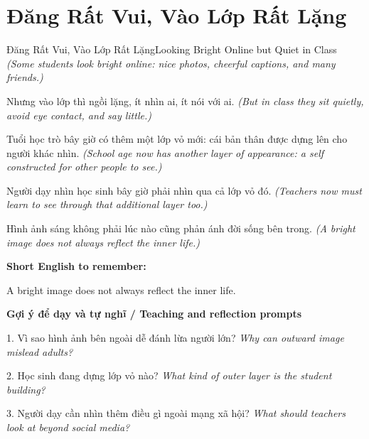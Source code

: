 \section{Đăng Rất Vui, Vào Lớp Rất Lặng}
\begin{truyen}{Đăng Rất Vui, Vào Lớp Rất Lặng}{Looking Bright Online but Quiet in Class}
\textit{(Some students look bright online: nice photos, cheerful captions, and many friends.)}

Nhưng vào lớp thì ngồi lặng, ít nhìn ai, ít nói với ai.
\textit{(But in class they sit quietly, avoid eye contact, and say little.)}

Tuổi học trò bây giờ có thêm một lớp vỏ mới: cái bản thân được dựng lên cho người khác nhìn.
\textit{(School age now has another layer of appearance: a self constructed for other people to see.)}

Người dạy nhìn học sinh bây giờ phải nhìn qua cả lớp vỏ đó.
\textit{(Teachers now must learn to see through that additional layer too.)}

\end{truyen}

\begin{baihoc}
Hình ảnh sáng không phải lúc nào cũng phản ánh đời sống bên trong.
\textit{(A bright image does not always reflect the inner life.)}
\end{baihoc}

\begin{ghinhoanh}
\textbf{Short English to remember:}

A bright image does not always reflect the inner life.

\end{ghinhoanh}

\begin{tuhocnhanh}
\textbf{Gợi ý để dạy và tự nghĩ / Teaching and reflection prompts}

1. Vì sao hình ảnh bên ngoài dễ đánh lừa người lớn? \textit{Why can outward image mislead adults?}

2. Học sinh đang dựng lớp vỏ nào? \textit{What kind of outer layer is the student building?}

3. Người dạy cần nhìn thêm điều gì ngoài mạng xã hội? \textit{What should teachers look at beyond social media?}
\end{tuhocnhanh}
\ngancach

